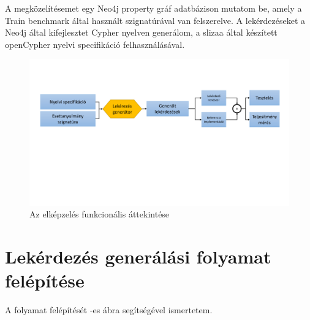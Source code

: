 A megközelítésemet egy Neo4j \cite{neo4j} property gráf adatbázison mutatom be, amely a Train benchmark \cite{szarnyas2018train} által használt szignatúrával van felszerelve. A  lekérdezéseket a Neo4j által kifejlesztet Cypher \cite{Cypher} nyelven generálom, a slizaa \cite{slizaa_2018} által készített openCypher nyelvi specifikáció felhasználásával. 


\begin{figure}
	\centering
	\includegraphics[width=1.0\textwidth]{figures/funkcionalisAttekintes}
	\caption{Az elképzelés funkcionális áttekintése}
	\label{fig:funkcionalisAttekintes}
\end{figure}
 
  

\section{Lekérdezés generálási folyamat felépítése}


A folyamat felépítését  -es ábra segítségével ismertetem.  

